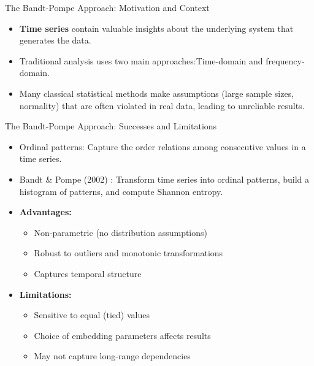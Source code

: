 \documentclass{beamer}
\begin{document}
\begin{frame}{The Bandt-Pompe Approach: Motivation and Context}
	\begin{itemize}
		\item \textbf{Time series} contain valuable insights about the underlying system that generates the data.
		\item Traditional analysis uses two main approaches:Time-domain and frequency-domain.
		\item Many classical statistical methods make assumptions (large sample sizes, normality) that are often violated in real data, leading to unreliable results.
	\end{itemize}
\end{frame}

\begin{frame}{The Bandt-Pompe Approach: Successes and Limitations}
	\begin{itemize}
		\item \alert{Ordinal patterns:} Capture the order relations among consecutive values in a time series.
		\item \alert{Bandt \& Pompe (2002) \cite{PhysRevLett.88.174102}:} Transform time series into ordinal patterns, build a histogram of patterns, and compute Shannon entropy.
		\item \textbf{Advantages:}
		\begin{itemize}
			\item Non-parametric (no distribution assumptions)
			\item Robust to outliers and monotonic transformations
			\item Captures temporal structure
		\end{itemize}
		\item \textbf{Limitations:}
		\begin{itemize}
			\item Sensitive to equal (tied) values
			\item Choice of embedding parameters affects results
			\item May not capture long-range dependencies
		\end{itemize}
	\end{itemize}
\end{frame}
\end{document}
